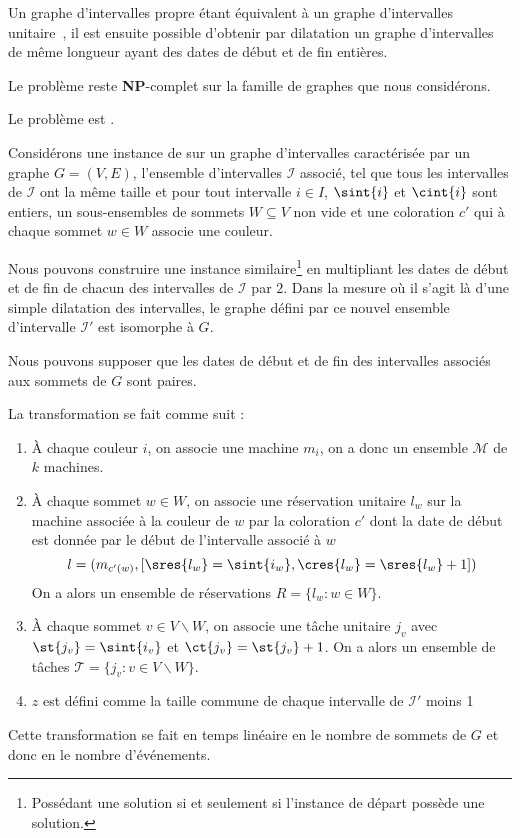 \documentclass[a4paper,9pt]{report}
\begin{document}
Un graphe d'intervalles propre étant équivalent à un graphe d'intervalles
unitaire~\cite{bogart1999short}, il est ensuite possible d'obtenir par dilatation un graphe
d'intervalles de même longueur ayant des dates de début et de fin entières.

\begin{ncorol}
    Le problème \precolor reste \textbf{NP}-complet sur la famille de graphes que nous considérons.
\end{ncorol}

\begin{nthrm}
    Le problème \unitfischedpi est \npc.
\end{nthrm}

Considérons une instance de \precolor sur un graphe d'intervalles caractérisée par un graphe $G =
(V,E)$, l'ensemble d'intervalles $\mathcal{I}$ associé, tel que tous les intervalles de
$\mathcal{I}$ ont la même taille et pour tout intervalle $i \in I$,
$\sint{i}$ et $\cint{i}$ sont entiers, un sous-ensembles de sommets $W \subseteq
V$ non vide et une coloration $c'$ qui à chaque sommet $w \in W$ associe une couleur. 

Nous pouvons construire une instance similaire\footnote{Possédant une solution si et seulement si
l'instance de départ possède une solution.} en multipliant les dates de début et de fin de chacun
des intervalles de $\mathcal{I}$ par $2$. Dans la mesure où il s'agit là d'une simple dilatation des
intervalles, le graphe défini par ce nouvel ensemble d'intervalle $\mathcal{I}'$ est isomorphe à
$G$.

Nous pouvons supposer que les dates de début et de fin des intervalles associés aux sommets de $G$
sont paires. 

La transformation se fait comme suit :
\begin{enumerate}
    \item À chaque couleur $i$, on associe une machine $m_i$, on a donc un ensemble $\mathcal{M}$ de
        $k$ machines.
    \item À chaque sommet $w \in W$, on associe une réservation unitaire $l_w$ sur la machine associée à
        la couleur de $w$ par la coloration $c'$ dont la date de début est donnée par le
        début de l'intervalle associé à $w$
        \[
            l = (m_{c'(w)}, [\sres{l_w} = \sint{i_w}, \cres{l_w} = \sres{l_w} + 1])
        \]
        On a alors un ensemble de réservations $R = \{l_w : w \in W\}$.
    \item À chaque sommet $v \in V \backslash W$, on associe une tâche unitaire $j_v$ avec $\st{j_v}
        = \sint{i_v}$ et $\ct{j_v} = \st{j_v} + 1$. On a alors un ensemble de tâches $\mathcal{T} =
        \{j_v : v \in V \backslash W \}$.
    \item $z$ est défini comme la taille commune de chaque intervalle de $\mathcal{I}'$ moins 1
\end{enumerate}
Cette transformation se fait en temps linéaire en le nombre de sommets de $G$ et donc en le nombre
d'événements.
\end{document}
